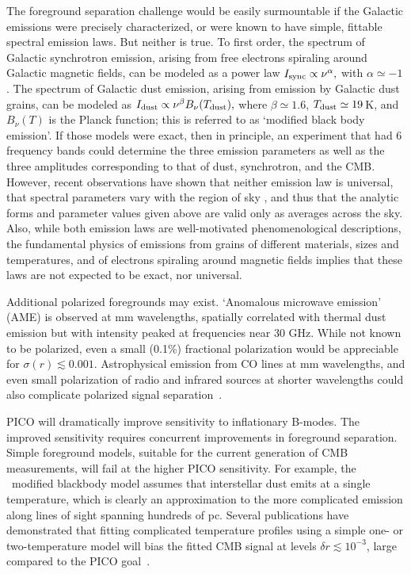 \documentclass[PICOReport.tex]{subfiles}
\begin{document}
The foreground separation challenge would be easily surmountable if the Galactic emissions were %
precisely characterized, or were known to have simple, fittable spectral emission laws. But neither is true. To first order, the spectrum of Galactic synchrotron emission, arising from free electrons spiraling around Galactic magnetic fields, can be modeled as a power law $I_{\rm sync} \propto \nu^{\alpha},$ with $\alpha \simeq -1$. 
The spectrum of Galactic dust emission, arising from emission by Galactic dust grains, can be modeled as $I_{\rm dust} \propto \nu^{\beta} B_\nu(T_{\rm dust}),$ where $\beta \simeq 1.6$, $T_{\rm dust} \simeq 19$\,K, and $B_\nu(T)$ is the Planck function; this is referred to as `modified black body emission'. If those models were exact, then in principle, an experiment that had 6 frequency bands could determine the three emission parameters as well as the three amplitudes corresponding to that of dust, synchrotron, and the CMB. However, recent observations have shown that neither emission law is universal, that spectral parameters vary with the region of sky \cite{SPASS_2018_variation,fuskeland2014_wmap_variation,planck_2013_xi}, and thus that the analytic forms and parameter values given above are valid only as averages across the sky. Also, while both emission laws are well-motivated phenomenological descriptions, the fundamental physics of emissions from grains of different materials, sizes and temperatures, and of electrons spiraling around magnetic fields implies that these laws are not expected to be exact, nor universal. 

Additional polarized foregrounds may exist.  `Anomalous microwave emission' (AME) is observed at mm wavelengths, spatially correlated with thermal dust emission but with intensity peaked at frequencies near 30 GHz.  While not
known to be polarized, even a small (0.1\%) fractional polarization would be appreciable for $\sigma(r) \lesssim 0.001$.  Astrophysical emission from CO lines at mm wavelengths, and even small polarization of radio and infrared sources at shorter wavelengths could also complicate polarized signal separation~\citep{trombetti2018_fracpol, puglisi2018_polsource}.

PICO will dramatically improve sensitivity to inflationary B-modes. The improved sensitivity requires concurrent improvements in foreground separation.  Simple foreground models, suitable for the current generation of CMB measurements, will fail at the higher PICO sensitivity.  For example, the \planck~modified blackbody model assumes that interstellar dust emits at a single temperature, which is clearly an approximation to the more complicated emission along lines of sight spanning hundreds of pc. Several publications have demonstrated that fitting complicated temperature profiles using a simple one- or two-temperature model will bias the fitted CMB signal at levels $\delta r \lesssim 10^{-3}$, large compared to the PICO goal~\citep{fantaye2011,armitage-caplan2012,kogut_fixsen2016,remazeilles/etal:2016,stompor2016}.
\end{document}
